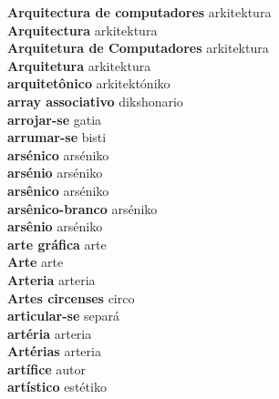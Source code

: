 \textbf{ Arquitectura de computadores  } arkitektura \\
\textbf{ Arquitectura  } arkitektura \\
\textbf{ Arquitetura de Computadores  } arkitektura \\
\textbf{ Arquitetura  } arkitektura \\
\textbf{ arquitetônico  } arkitektóniko \\
\textbf{ array associativo  } dikshonario \\
\textbf{ arrojar-se  } gatia \\
\textbf{ arrumar-se  } bisti \\
\textbf{ arsénico  } arséniko \\
\textbf{ arsénio  } arséniko \\
\textbf{ arsênico  } arséniko \\
\textbf{ arsênico-branco  } arséniko \\
\textbf{ arsênio  } arséniko \\
\textbf{ arte gráfica  } arte \\
\textbf{ Arte  } arte \\
\textbf{ Arteria  } arteria \\
\textbf{ Artes circenses  } circo \\
\textbf{ articular-se  } separá \\
\textbf{ artéria  } arteria \\
\textbf{ Artérias  } arteria \\
\textbf{ artífice  } autor \\
\textbf{ artístico  } estétiko \\
